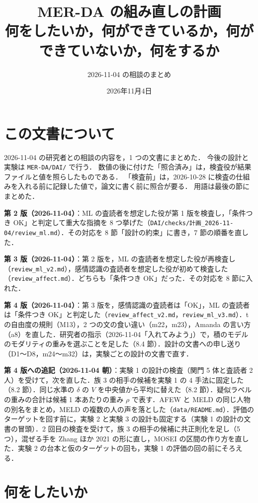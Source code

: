 \documentclass[11pt,a4paper]{ltjsarticle}
\title{MER-DA の組み直しの計画\\[2pt]\large 何をしたいか，何ができているか，何ができていないか，何をするか}
\author{2026-11-04 の相談のまとめ}
\date{2026年11月4日}
\begin{document}
\maketitle

\section{この文書について}

2026-11-04 の研究者との相談の内容を，1 つの文書にまとめた．
今後の設計と実験は \texttt{MER-DA/DAI/} で行う．
数値の後に付けた「照合済み」は，検査役が結果ファイルと値を照らしたものである．
「検査前」は，2026-10-28 に検査の仕組みを入れる前に記録した値で，論文に書く前に照合が要る．
用語は最後の節にまとめた．

\textbf{第 2 版（2026-11-04）}：ML の査読者を想定した役が第 1 版を検査し，「条件つき OK」と判定して重大な指摘を 8 つ挙げた（\texttt{DAI/checks/計画\_2026-11-04/review\_ml.md}）．その対応を 8 節「設計の約束」に書き，7 節の順番を直した．

\textbf{第 3 版（2026-11-04）}：第 2 版を，ML の査読者を想定した役が再検査し（\texttt{review\_ml\_v2.md}），感情認識の査読者を想定した役が初めて検査した（\texttt{review\_affect.md}）．どちらも「条件つき OK」だった．その対応を 8 節に入れた．

\textbf{第 4 版（2026-11-04）}：第 3 版を，感情認識の査読者は「OK」，ML の査読者は「条件つき OK」と判定した（\texttt{review\_affect\_v2.md}，\texttt{review\_ml\_v3.md}）．t の自由度の規則（M13），2 つの文の食い違い（m22，m23），Amanda の言い方（a8）を直した．研究者の指示（2026-11-04「入れてみよう」）で，積のモデルのモダリティの重みを選ぶことを足した（8.4 節）．設計の文書への申し送り（D1〜D8，m24〜m32）は，実験ごとの設計の文書で直す．

\textbf{第 4 版への追記（2026-11-04 朝）}：実験 1 の設計の検査（関門 5 体と査読者 2 人）を受けて，次を直した．族 3 の相手の候補を実験 1 の 4 手法に固定した（8.2 節）．同じ水準の $\delta$ の $V$ を中央値から平均に替えた（8.2 節）．疑似ラベルの重みの合計は候補 1 本あたりの重み $\rho$ で表す．AFEW と MELD の同じ人物の別名をまとめ，MELD の複数の人の声を落とした（\texttt{data/README.md}）．評価のターゲットを回す前に，実験 2 と実験 3 の設計も固定する（実験 1 の設計の文書の冒頭）．2 回目の検査を受けて，族 3 の相手の候補に共正則化を足し（5 つ），混ぜる手を Zhang ほか 2021 の形に直し，MOSEI の区間の作り方を直した．実験 2 の台本と仮のターゲットの回も，実験 1 の評価の回の前にそろえる．

\section{何をしたいか}
\end{document}

